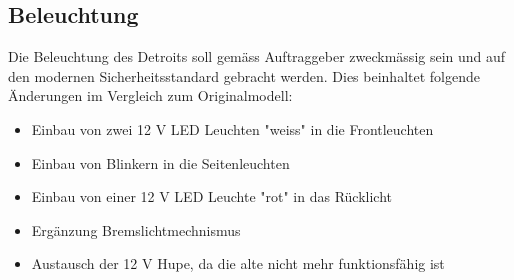 \subsection{Beleuchtung}

Die Beleuchtung des Detroits soll gemäss Auftraggeber zweckmässig sein und auf den modernen Sicherheitsstandard gebracht werden. Dies beinhaltet folgende Änderungen im Vergleich zum Originalmodell:
\begin{itemize}
\item Einbau von zwei 12 V LED Leuchten "weiss" in die Frontleuchten
\item Einbau von Blinkern in die Seitenleuchten
\item Einbau von einer 12 V LED Leuchte "rot" in das Rücklicht
\item Ergänzung Bremslichtmechnismus
\item Austausch der 12 V Hupe, da die alte nicht mehr funktionsfähig ist
\end{itemize}


\newpage